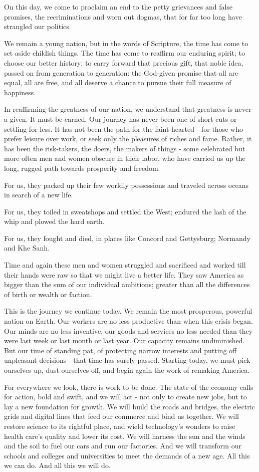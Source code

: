 \documentclass[12pt,a4paper,onecolumn]{article}
\begin{document}
\begin{sffamily}
On this day, we come to proclaim an end to the petty grievances and false promises, the
recriminations and worn out dogmas, that for far too long have strangled our politics.

We remain a young nation, but in the words of Scripture, the time has come to set aside childish
things. The time has come to reaffirm our enduring spirit; to choose our better history; to carry
forward that precious gift, that noble idea, passed on from generation to generation: the God-given
promise that all are equal, all are free, and all deserve a chance to pursue their full measure of
happiness.

In reaffirming the greatness of our nation, we understand that greatness is never a given. It must
be earned. Our journey has never been one of short-cuts or settling for less. It has not been the
path for the faint-hearted - for those who prefer leisure over work, or seek only the pleasures of
riches and fame. Rather, it has been the risk-takers, the doers, the makers of things - some
celebrated but more often men and women obscure in their labor, who have carried us up the long,
rugged path towards prosperity and freedom.

For us, they packed up their few worldly possessions and traveled across oceans in search of a new
life.

For us, they toiled in sweatshops and settled the West; endured the lash of the whip and plowed the
hard earth.

For us, they fought and died, in places like Concord and Gettysburg; Normandy and Khe Sanh.

Time and again these men and women struggled and sacrificed and worked till their hands were raw so
that we might live a better life. They saw America as bigger than the sum of our individual
ambitions; greater than all the differences of birth or wealth or faction.

This is the journey we continue today. We remain the most prosperous, powerful nation on Earth. Our
workers are no less productive than when this crisis began. Our minds are no less inventive, our
goods and services no less needed than they were last week or last month or last year. Our capacity
remains undiminished. But our time of standing pat, of protecting narrow interests and putting off
unpleasant decisions - that time has surely passed. Starting today, we must pick ourselves up, dust
ourselves off, and begin again the work of remaking America.

For everywhere we look, there is work to be done. The state of the economy calls for action, bold
and swift, and we will act - not only to create new jobs, but to lay a new foundation for growth. We
will build the roads and bridges, the electric grids and digital lines that feed our commerce and
bind us together. We will restore science to its rightful place, and wield technology's wonders to
raise health care's quality and lower its cost. We will harness the sun and the winds and the soil
to fuel our cars and run our factories. And we will transform our schools and colleges and
universities to meet the demands of a new age. All this we can do. And all this we will do.


\end{sffamily}
\end{document}
